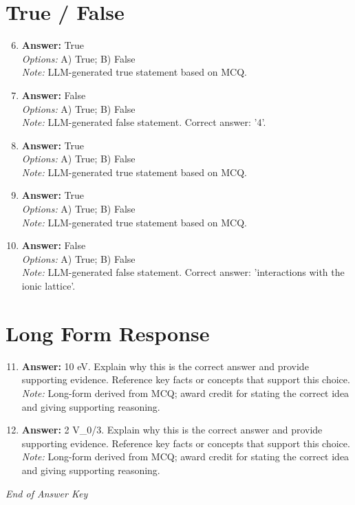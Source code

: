\documentclass[12pt]{article}
\begin{document}
\section*{True / False}
\begin{enumerate}[label=\arabic*.]
\setcounter{enumi}{5}
\item \textbf{Answer:} True
\\ \textit{Options:} A) True; B) False
\\ \textit{Note:} LLM-generated true statement based on MCQ.
\item \textbf{Answer:} False
\\ \textit{Options:} A) True; B) False
\\ \textit{Note:} LLM-generated false statement. Correct answer: '4'.
\item \textbf{Answer:} True
\\ \textit{Options:} A) True; B) False
\\ \textit{Note:} LLM-generated true statement based on MCQ.
\item \textbf{Answer:} True
\\ \textit{Options:} A) True; B) False
\\ \textit{Note:} LLM-generated true statement based on MCQ.
\item \textbf{Answer:} False
\\ \textit{Options:} A) True; B) False
\\ \textit{Note:} LLM-generated false statement. Correct answer: 'interactions with the ionic lattice'.
\end{enumerate}

\section*{Long Form Response}
\begin{enumerate}[label=\arabic*.]
\setcounter{enumi}{10}
\item \textbf{Answer:} 10 eV. Explain why this is the correct answer and provide supporting evidence. Reference key facts or concepts that support this choice.
\\ \textit{Note:} Long-form derived from MCQ; award credit for stating the correct idea and giving supporting reasoning.
\item \textbf{Answer:} 2 V\_0/3. Explain why this is the correct answer and provide supporting evidence. Reference key facts or concepts that support this choice.
\\ \textit{Note:} Long-form derived from MCQ; award credit for stating the correct idea and giving supporting reasoning.
\end{enumerate}

\vfill
\noindent\textit{End of Answer Key}
\end{document}
